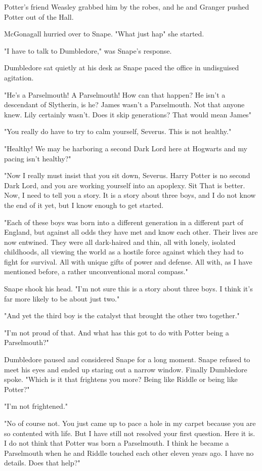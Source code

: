 Potter's friend Weasley grabbed him by the robes, and he and Granger pushed Potter out of the Hall.

McGonagall hurried over to Snape. "What just hap{\el}" she started.

"I have to talk to Dumbledore," was Snape's response.

Dumbledore sat quietly at his desk as Snape paced the office in undisguised agitation.

"He's a Parselmouth! A Parselmouth! How can that happen? He isn't a descendant of Slytherin, is he? James wasn't a Parselmouth. Not that anyone knew. Lily certainly wasn't. Does it skip generations? That would mean James{\el}"

"You really do have to try to calm yourself, Severus. This is not healthy."

"Healthy! We may be harboring a second Dark Lord here at Hogwarts and my pacing isn't healthy?"

"Now I really must insist that you sit down, Severus. Harry Potter is no second Dark Lord, and you are working yourself into an apoplexy. Sit{\el} That is better. Now, I need to tell you a story. It is a story about three boys, and I do not know the end of it yet, but I know enough to get started.

"Each of these boys was born into a different generation in a different part of England, but against all odds they have met and know each other. Their lives are now entwined. They were all dark-haired and thin, all with lonely, isolated childhoods, all viewing the world as a hostile force against which they had to fight for survival. All with unique gifts of power and defense. All with, as I have mentioned before, a rather unconventional moral compass."

Snape shook his head. "I'm not sure this is a story about three boys. I think it's far more likely to be about just two."

"And yet the third boy is the catalyst that brought the other two together."

"I'm not proud of that. And what has this got to do with Potter being a Parselmouth?"

Dumbledore paused and considered Snape for a long moment. Snape refused to meet his eyes and ended up staring out a narrow window. Finally Dumbledore spoke. "Which is it that frightens you more? Being like Riddle or being like Potter?"

"I'm not frightened."

"No of course not. You just came up to pace a hole in my carpet because you are so contented with life. But I have still not resolved your first question. Here it is. I do not think that Potter was born a Parselmouth. I think he became a Parselmouth when he and Riddle touched each other eleven years ago. I have no details. Does that help?"

